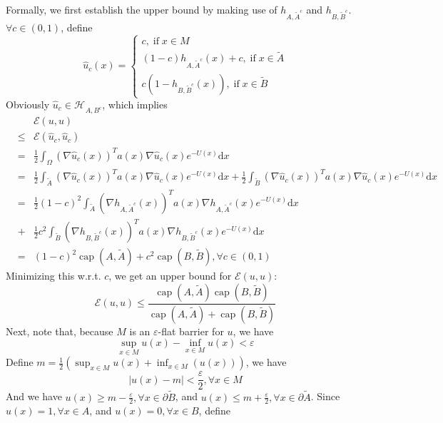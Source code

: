 \documentclass[english, aip, jcp, priprint, graphicx,floatfix]{revtex4-1}
\newcommand{\mathd}{\mathrm{d}}
\newcommand{\tmop}[1]{\ensuremath{\operatorname{#1}}}
\theoremstyle{plain}
\theoremstyle{definition}
\theoremstyle{plain}
\begin{document}
Formally, we first establish the upper bound by making use of $h_{A,
\tilde{A}^c}$ and $h_{B, \widetilde{B}^c}$. $\forall c \in (0, 1)$, define
\[ \hat{u}_c (x) = \left\{ \begin{array}{l}
c, \tmop{if} x \in M\\
(1 - c) h_{A, \widetilde{A}^c} (x) + c, \tmop{if} x \in \tilde{A}\\
c (1 - h_{B, \widetilde{B}^c} (x)), \tmop{if} x \in \tilde{B}
\end{array} \right. \]
Obviously $\hat{u}_c \in \mathcal{H_{}}_{A, B^c}$, which implies
\begin{eqnarray*}
&  & \mathcal{E} (u, u)\\
& \leqslant & \mathcal{E} (\hat{u}_c, \hat{u}_c)\\
& = & \frac{1}{2} \int_{\Omega} (\nabla \hat{u}_c (x))^T a (x)
\nabla \hat{u}_c (x) e^{- U (x)} \mathd x\\
& = & \frac{1}{2} \int_{\tilde{A}} (\nabla \hat{u}_c (x))^T a (x) \nabla
\hat{u}_c (x) e^{- U (x)} \mathd x + \frac{1}{2} \int_{\tilde{B}} (\nabla
\hat{u}_c (x))^T a (x) \nabla \hat{u}_c (x) e^{- U (x)} \mathd x\\
& = & \frac{1}{2} (1 - c)^2 \int_{\tilde{A}} (\nabla h_{A, \widetilde{A}^c}
(x))^T a (x) \nabla h_{A, \widetilde{A}^c} (x) e^{- U (x)} \mathd x\\
& + & \frac{1}{2} c^2 \int_{\tilde{B}} (\nabla h_{B, \widetilde{B}^c}
(x))^T a (x) \nabla h_{B, \widetilde{B}^c} (x) e^{- U (x)} \mathd x\\
& = & (1 - c)^2 \tmop{cap} (A, \tilde{A}) + c^2 \tmop{cap} (B, \tilde{B}),
\forall c \in (0, 1)
\end{eqnarray*}
Minimizing this w.r.t. $c$, we get an upper bound for $\mathcal{E} (u, u)$:
\[ \mathcal{E} (u, u) \leqslant \frac{\tmop{cap} (A, \tilde{A}) \tmop{cap} (B,
\tilde{B})}{\tmop{cap} (A, \tilde{A}) + \tmop{cap} (B, \tilde{B})} \]
Next, note that, because $M$ is an $\varepsilon$-flat barrier for $u$, we have
\[ \sup_{x \in M} u (x) - \inf_{x \in M} u (x) < \varepsilon \]
Define $m = \frac{1}{2} (\sup_{x \in M} u (x) + \inf_{x \in M} (u (x)))$, we have
\begin{equation}
\label{epsilonflat}
| u (x) - m | < \frac{\varepsilon}{2}, \forall x \in M 
\end{equation}
And we have $u (x) \geqslant m - \frac{\varepsilon}{2}, \forall x \in \partial \tilde{B}$, and $u (x) \leqslant m + \frac{\varepsilon}{2}, \forall x \in \partial \tilde{A}$. Since $u (x) = 1, \forall x \in A$, and $u (x) = 0, \forall x \in B$, define
\end{document}
